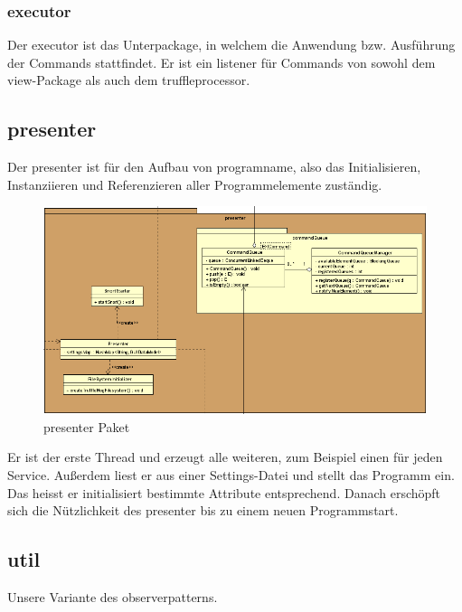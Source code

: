     \subsubsection{executor}
    Der executor ist das Unterpackage, in welchem die Anwendung bzw.
    Ausführung der Commands stattfindet. Er ist ein \gls{listener} für Commands
    von sowohl dem view-Package als auch dem truffleprocessor.


\subsection{presenter}


Der presenter ist für den Aufbau von \gls{programname}, also das
Initialisieren, Instanziieren und Referenzieren aller Programmelemente zuständig.

\begin{figure}[H]
  \centering
  \includegraphics[width=\textwidth]{../diagramimages/presenter.png}
  \caption{presenter Paket}
\end{figure}

Er ist der erste Thread und erzeugt alle weiteren, zum Beispiel einen für jeden
Service. Außerdem liest er aus einer Settings-Datei und stellt das Programm ein.
Das heisst er initialisiert bestimmte Attribute entsprechend. Danach erschöpft
sich die Nützlichkeit des presenter bis zu einem neuen Programmstart.


\subsection{util}


Unsere Variante des \gls{observerpattern}s.

